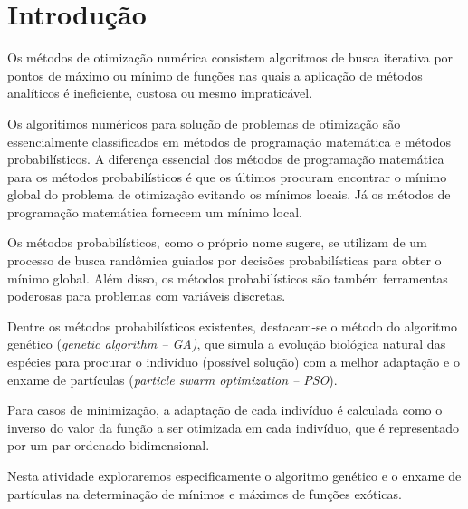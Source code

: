 \documentclass[a4paper,12pt]{article}
\begin{document}
\begin{center}
\tableofcontents
\end{center}

\newpage


\thispagestyle{main}

\section{Introdução}

Os métodos de otimização numérica consistem algoritmos de busca iterativa por pontos de máximo ou mínimo de funções nas quais a aplicação de métodos analíticos é ineficiente, custosa ou mesmo impraticável.

Os algoritimos numéricos para solução de problemas de otimização são essencialmente classificados em métodos de programação matemática e métodos probabilísticos. A diferença essencial dos métodos de programação matemática para os métodos probabilísticos é que os últimos procuram encontrar o mínimo global do problema de otimização evitando os mínimos locais. Já os métodos de programação matemática fornecem um mínimo local. 

Os métodos probabilísticos, como o próprio nome sugere, se utilizam de um processo de busca randômica guiados por decisões probabilísticas para obter o mínimo global. Além disso, os métodos probabilísticos são também ferramentas poderosas para problemas com variáveis discretas. 

Dentre os métodos probabilísticos existentes, destacam-se o método do algoritmo genético (\emph{genetic algorithm -- GA)}, que simula a evolução biológica natural das espécies para procurar o indivíduo (possível solução) com a melhor adaptação e o enxame de partículas (\emph{particle swarm optimization -- PSO}). 

Para casos de minimização, a adaptação de cada indivíduo é calculada como o inverso do valor da função a ser otimizada em cada indivíduo, que é representado por um par ordenado bidimensional.

Nesta atividade exploraremos especificamente o algoritmo genético e o enxame de partículas na determinação de mínimos e máximos de funções exóticas.

\newpage


\thispagestyle{main}
\end{document}
